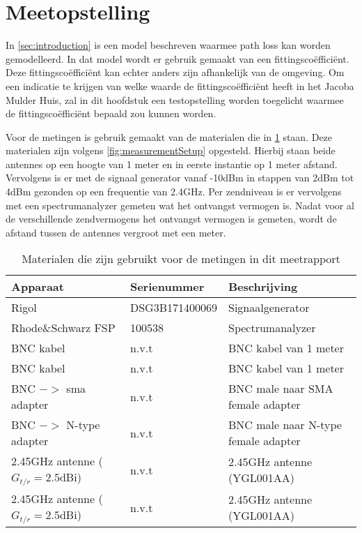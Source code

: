 \section{Meetopstelling} \label{sec:methods}
In \cref{sec:introduction} is een model beschreven waarmee path loss kan worden gemodelleerd. In dat model wordt er gebruik gemaakt van een fittingscoëfficiënt. Deze fittingscoëfficiënt kan echter anders zijn afhankelijk van de omgeving. Om een indicatie te krijgen van welke waarde de fittingscoëfficiënt heeft in het Jacoba Mulder Huis, zal in dit hoofdstuk een testopstelling worden toegelicht waarmee de fittingscoëfficiënt bepaald zou kunnen worden.

Voor de metingen is gebruik gemaakt van de materialen die in \cref{tab:measurement:materials} staan. Deze materialen zijn volgens \cref{fig:measurementSetup} opgesteld. Hierbij staan beide antennes op een hoogte van 1 meter en in eerste instantie op 1 meter afstand. Vervolgens is er met de signaal generator vanaf -10dBm in stappen van 2dBm tot 4dBm gezonden op een frequentie van 2.4GHz. Per zendniveau is er vervolgens met een spectrumanalyzer gemeten wat het ontvangst vermogen is. Nadat voor al de verschillende zendvermogens het ontvangst vermogen is gemeten, wordt de afstand tussen de antennes vergroot met een meter. 
\begin{table}[ht]
    \centering
    \begin{tabular}{l|l|l}
        Apparaat                            & Serienummer       & Beschrijving \\\hline
        Rigol                               & DSG3B171400069    & Signaalgenerator \\
        Rhode\&Schwarz FSP                  & 100538            & Spectrumanalyzer \\
        BNC kabel                           & n.v.t             & BNC kabel van 1 meter \\
        BNC kabel                           & n.v.t             & BNC kabel van 1 meter \\
        BNC $->$ sma adapter                & n.v.t             & BNC male naar SMA female adapter \\
        BNC $->$ N-type adapter             & n.v.t             & BNC male naar N-type female adapter \\
        2.45GHz antenne ($G_{t/r}=2.5$dBi)  & n.v.t             & 2.45GHz antenne (YGL001AA) \\
        2.45GHz antenne ($G_{t/r}=2.5$dBi)  & n.v.t             & 2.45GHz antenne (YGL001AA) \\\hline
    \end{tabular}
    \caption{Materialen die zijn gebruikt voor de metingen in dit meetrapport}
    \label{tab:measurement:materials}
\end{table}
